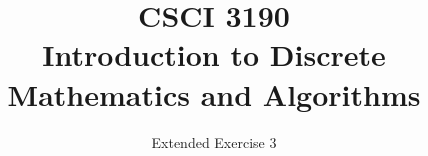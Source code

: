 \documentclass{sig-alternate-05-2015}
\begin{document}






%

\title{CSCI 3190 \\ Introduction to Discrete Mathematics and Algorithms}
\subtitle{Extended Exercise 3}

\maketitle
\begin{abstract}

\end{abstract}

\keywords{}
\end{document}
